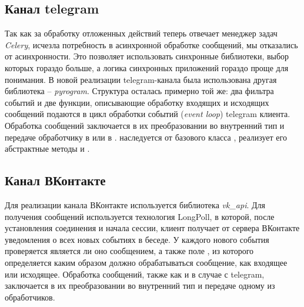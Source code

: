     \subsection{Канал telegram}
    Так как за обработку отложенных действий теперь отвечает менеджер задач \textit{Celery},
    исчезла потребность в асинхронной обработке сообщений, мы отказались от асинхронности.
    Это позволяет использовать синхронные библиотеки, выбор которых гораздо больше,
    а логика синхронных приложений гораздо проще для понимания.
    В новой реализации telegram-канала была использована другая библиотека -- \textit{pyrogram}\cite{docs.pyrogram}.
    Структура  осталась примерно той же: два фильтра событий и две функции, описывающие
    обработку входящих и исходящих сообщений подаются в цикл обработки событий (\textit{event loop})
    telegram клиента.
    Обработка сообщений заключается в их преобразовании во внутренний тип 
    и передаче обработчику в  или в .
     наследуется от базового класса ,
    реализует его абстрактные методы  и .

    \subsection{Канал ВКонтакте}
    Для реализации канала ВКонтакте используется
    библиотека \textit{vk\_api}\cite{docs.vkapi}.
    Для получения сообщений используется технология LongPoll, в которой, после
    установления соединения и начала сессии, клиент получает
    от сервера ВКонтакте уведомления о всех новых событиях в беседе.
    У каждого нового события проверяется
    является ли оно сообщением, а также поле , из которого определяется каким образом
    должно обрабатываться сообщение, как входящее или исходящее.
    Обработка сообщений, также как и в случае с telegram, заключается в их преобразовании во внутренний тип
    и передаче одному из обработчиков.


